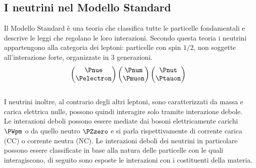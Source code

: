 \documentclass[../../main.tex]{subfiles}
\begin{document}
\subsection{I neutrini nel Modello Standard}
  \label{subsec:il-neutrino-nel-modello-standard}
  Il Modello Standard è una teoria che classifica tutte le particelle
  fondamentali e descrive le leggi che regolano le loro interazioni.
  Secondo questa teoria i neutrini appartengono alla categoria dei
  leptoni: particelle con spin $1/2$, non soggette all'interazione forte,
  organizzate in 3 generazioni.\\
  \begin{equation*}
    \begin{pmatrix}
      \Pnue \\ \Pelectron
    \end{pmatrix}
    \begin{pmatrix}
      \Pnum \\ \Pmuon
    \end{pmatrix}
    \begin{pmatrix}
      \Pnut \\ \Ptauon
    \end{pmatrix}
  \end{equation*}\\
  I neutrini inoltre, al contrario degli altri leptoni, sono caratterizzati
  da massa e carica elettrica nulle, possono quindi interagire solo tramite
  interazione debole.\\
  Le interazioni deboli possono essere mediate dai bosoni elettricamente carichi
  $\PWpm$ o da quello neutro $\PZzero$ e si parla rispettivamente di
  corrente carica (CC) o corrente neutra (NC).
  Le interazioni deboli dei neutrini in particolare possono essere classificate
  in base alla natura delle particelle con le quali interagiscono, di seguito
  sono esposte le interazioni con i costituenti della materia.
\end{document}
